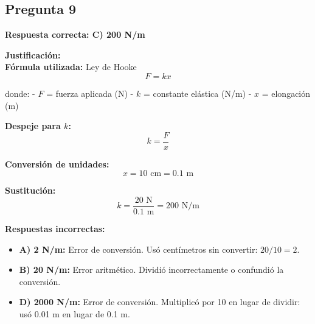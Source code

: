 \begin{respuestabox}

\subsection{Pregunta 9}
\textcolor{verdecorrecto}{\textbf{Respuesta correcta: C) 200 N/m}}

\textbf{Justificación:}\\
\textbf{Fórmula utilizada:} Ley de Hooke
$$F = kx$$

donde:
- $F$ = fuerza aplicada (N)
- $k$ = constante elástica (N/m)
- $x$ = elongación (m)

\textbf{Despeje para $k$:}
$$k = \frac{F}{x}$$

\textbf{Conversión de unidades:}
$$x = 10 \text{ cm} = 0.1 \text{ m}$$

\textbf{Sustitución:}
$$k = \frac{20 \text{ N}}{0.1 \text{ m}} = 200 \text{ N/m}$$

\textbf{Respuestas incorrectas:}
\begin{itemize}
    \item \textbf{A) 2 N/m:} Error de conversión. Usó centímetros sin convertir: $20/10 = 2$.
    \item \textbf{B) 20 N/m:} Error aritmético. Dividió incorrectamente o confundió la conversión.
    \item \textbf{D) 2000 N/m:} Error de conversión. Multiplicó por 10 en lugar de dividir: usó 0.01 m en lugar de 0.1 m.
\end{itemize}
\end{respuestabox}

